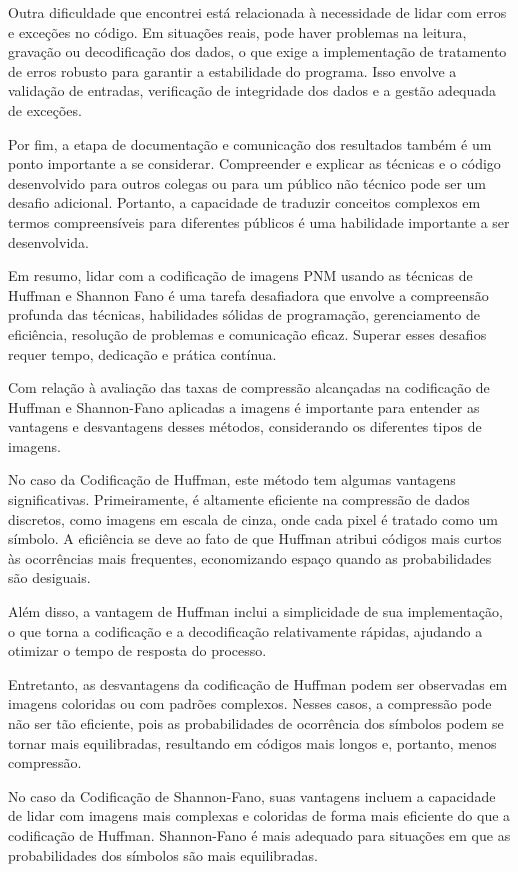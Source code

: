 \documentclass{article}
\begin{document}
Outra dificuldade que encontrei está relacionada à necessidade de lidar com erros e exceções no código. Em situações reais, pode haver problemas na leitura, gravação ou decodificação dos dados, o que exige a implementação de tratamento de erros robusto para garantir a estabilidade do programa. Isso envolve a validação de entradas, verificação de integridade dos dados e a gestão adequada de exceções.

Por fim, a etapa de documentação e comunicação dos resultados também é um ponto importante a se considerar. Compreender e explicar as técnicas e o código desenvolvido para outros colegas ou para um público não técnico pode ser um desafio adicional. Portanto, a capacidade de traduzir conceitos complexos em termos compreensíveis para diferentes públicos é uma habilidade importante a ser desenvolvida.

Em resumo, lidar com a codificação de imagens PNM usando as técnicas de Huffman e Shannon Fano é uma tarefa desafiadora que envolve a compreensão profunda das técnicas, habilidades sólidas de programação, gerenciamento de eficiência, resolução de problemas e comunicação eficaz. Superar esses desafios requer tempo, dedicação e prática contínua.

Com relação à avaliação das taxas de compressão alcançadas na codificação de Huffman e Shannon-Fano aplicadas a imagens é importante para entender as vantagens e desvantagens desses métodos, considerando os diferentes tipos de imagens.

No caso da Codificação de Huffman, este método tem algumas vantagens significativas. Primeiramente, é altamente eficiente na compressão de dados discretos, como imagens em escala de cinza, onde cada pixel é tratado como um símbolo. A eficiência se deve ao fato de que Huffman atribui códigos mais curtos às ocorrências mais frequentes, economizando espaço quando as probabilidades são desiguais.

Além disso, a vantagem de Huffman inclui a simplicidade de sua implementação, o que torna a codificação e a decodificação relativamente rápidas, ajudando a otimizar o tempo de resposta do processo.

Entretanto, as desvantagens da codificação de Huffman podem ser observadas em imagens coloridas ou com padrões complexos. Nesses casos, a compressão pode não ser tão eficiente, pois as probabilidades de ocorrência dos símbolos podem se tornar mais equilibradas, resultando em códigos mais longos e, portanto, menos compressão.

No caso da Codificação de Shannon-Fano, suas vantagens incluem a capacidade de lidar com imagens mais complexas e coloridas de forma mais eficiente do que a codificação de Huffman. Shannon-Fano é mais adequado para situações em que as probabilidades dos símbolos são mais equilibradas.
\end{document}
